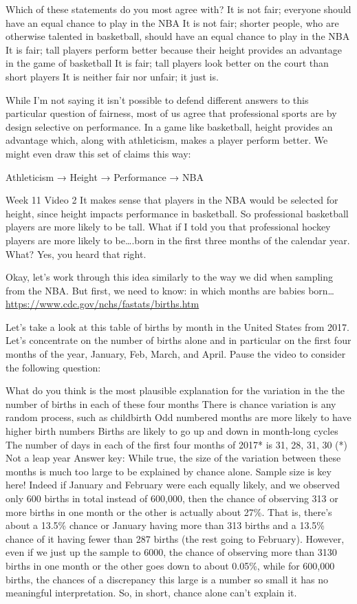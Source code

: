 \documentclass[]{book}
\begin{document}
Which of these statements do you most agree with?
It is not fair; everyone should have an equal chance to play in the NBA
It is not fair; shorter people, who are otherwise talented in basketball, should have an equal chance to play in the NBA
It is fair; tall players perform better because their height provides an advantage in the game of basketball
It is fair; tall players look better on the court than short players
It is neither fair nor unfair; it just is.

While I'm not saying it isn't possible to defend different answers to this particular question of fairness, most of us agree that professional sports are by design selective on performance. In a game like basketball, height provides an advantage which, along with athleticism, makes a player perform better. We might even draw this set of claims this way:

Athleticism →
Height → Performance → NBA

Week 11 Video 2
It makes sense that players in the NBA would be selected for height, since height impacts performance in basketball. So professional basketball players are more likely to be tall. What if I told you that professional hockey players are more likely to be\ldots{}.born in the first three months of the calendar year. What? Yes, you heard that right.

Okay, let's work through this idea similarly to the way we did when sampling from the NBA.
But first, we need to know: in which months are babies born\ldots{}
\url{https://www.cdc.gov/nchs/fastats/births.htm}

Let's take a look at this table of births by month in the United States from 2017. Let's concentrate on the number of births alone and in particular on the first four months of the year, January, Feb, March, and April. Pause the video to consider the following question:

What do you think is the most plausible explanation for the variation in the the number of births in each of these four months
There is chance variation is any random process, such as childbirth
Odd numbered months are more likely to have higher birth numbers
Births are likely to go up and down in month-long cycles
The number of days in each of the first four months of 2017* is 31, 28, 31, 30
(*) Not a leap year
Answer key:
While true, the size of the variation between these months is much too large to be explained by chance alone. Sample size is key here! Indeed if January and February were each equally likely, and we observed only 600 births in total instead of 600,000, then the chance of observing 313 or more births in one month or the other is actually about 27\%. That is, there's about a 13.5\% chance or January having more than 313 births and a 13.5\% chance of it having fewer than 287 births (the rest going to February). However, even if we just up the sample to 6000, the chance of observing more than 3130 births in one month or the other goes down to about 0.05\%, while for 600,000 births, the chances of a discrepancy this large is a number so small it has no meaningful interpretation. So, in short, chance alone can't explain it.
\end{document}
